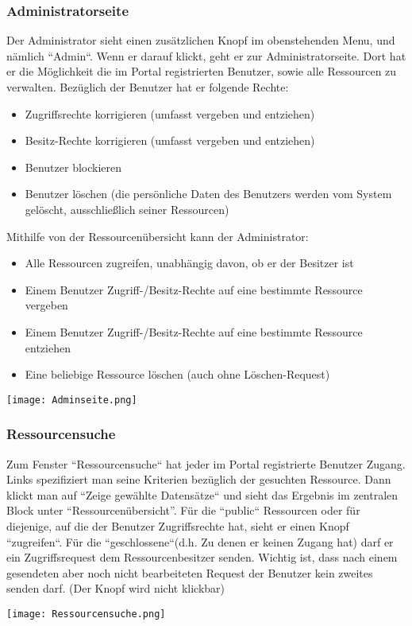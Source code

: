 \documentclass[parskip=full,11pt]{scrartcl}
\begin{document}
\subsubsection*{Administratorseite}
Der Administrator sieht einen zusätzlichen Knopf im obenstehenden Menu, und nämlich ``Admin``. Wenn er darauf klickt, geht er zur Administratorseite. Dort hat er die Möglichkeit die im Portal registrierten Benutzer, sowie alle Ressourcen zu verwalten. Bezüglich der Benutzer hat er folgende Rechte:
\begin{itemize}
	\item Zugriffsrechte korrigieren (umfasst vergeben und entziehen)
	\item Besitz-Rechte korrigieren (umfasst vergeben und entziehen)
	\item Benutzer blockieren
	\item Benutzer löschen (die persönliche Daten des Benutzers werden vom System gelöscht, ausschließlich seiner Ressourcen)
\end{itemize}  
 Mithilfe von der Ressourcenübersicht kann der Administrator:
 \begin{itemize}
 	\item Alle Ressourcen zugreifen, unabhängig davon, ob er der Besitzer ist
 	\item Einem Benutzer Zugriff-/Besitz-Rechte auf eine bestimmte Ressource vergeben
 	\item Einem Benutzer Zugriff-/Besitz-Rechte auf eine bestimmte Ressource entziehen
 	\item Eine beliebige Ressource löschen (auch ohne Löschen-Request)
 \end{itemize}
	\begin{center}
	\texttt{[image: Adminseite.png]}
	\end{center}
	
\subsubsection*{Ressourcensuche}
Zum Fenster ``Ressourcensuche`` hat jeder im Portal registrierte Benutzer Zugang. Links spezifiziert man seine Kriterien bezüglich der gesuchten Ressource. Dann klickt man auf 
``Zeige gewählte Datensätze`` und sieht das Ergebnis im zentralen Block unter “Ressourcenübersicht”. Für die ``public`` Ressourcen oder für diejenige, auf die der Benutzer Zugriffsrechte hat, sieht er einen Knopf ``zugreifen``. Für die ``geschlossene``(d.h. Zu denen er keinen Zugang hat) darf er ein Zugriffsrequest dem Ressourcenbesitzer senden. Wichtig ist, dass nach einem gesendeten aber noch nicht bearbeiteten Request der Benutzer kein zweites senden darf. (Der Knopf wird nicht klickbar)
	\begin{center}
	\texttt{[image: Ressourcensuche.png]}
	\end{center}
	
\end{document}
